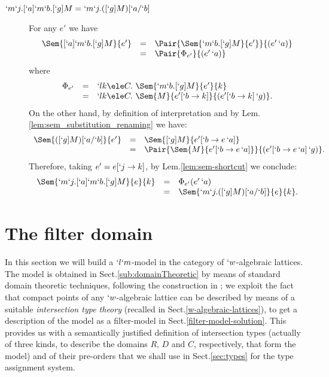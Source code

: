 \documentclass{CSML}
\begin{document}
\begin{description}
\item [{$`m`j.[`a]`m`b.[`g]M = `m`j. ([`g]M)[`a/`b] $}]
For any $e'$ %
we have 
 \[ \begin{array}{rcl}
\Sem{[`a]`m`b.[`g]M}{e'} 
	&=& \Pair{\Sem{`m`b.[`g]M}{e'}}{(e'\, `a)} \\ 
	&=& \Pair{\Phi_{e'}}{(e'\, `a)} \end{array} \]
where
 \[ \begin{array}{rcl}
\Phi_{e'} 
	&=& `l k \ele C.~\Sem{`m`b.[`g]M}{e'}{k} \\ 
	&=& `l k \ele C.~\Sem{M}{e'[`b \to k]}{(e'[`b \to k]\, `g)}. 
 \end{array} \]
On the other hand, by definition of interpretation and by Lem.\skp\ref{lem:sem_substitution_renaming} we have:
 \[ \begin{array}{rcl}
\Sem{([`g]M)[`a/`b]}{e'} 
	&=& \Sem{[`g]M}{e'[`b \to e\,`a]} \\
	&=& \Pair{\Sem{M}{e'[`b \to e\,`a]}}{(e'[`b \to e\,`a]\,`g)}.
 \end{array} \]
Therefore, taking $e' = e[`j \to k]$, by Lem.\skp\ref{lem:sem-shortcut} we conclude:
 \[ \begin{array}{rcl}
\Sem{`m`j.[`a]`m`b.[`g]M}{ e }{ k } 
	&=& \Phi_{e'}(e'\,`a) \\
	&=& \Sem{`m`j. ([`g]M)[`a/`b]}{e}{k}.
 \end{array} \]
 \arrayqed[-22pt]

 \end{description}


 \section{The filter domain} \label{sec:filter}

 In this section we will build a $`l`m$-model in the category of $`w$-algebraic lattices. 
The model is obtained in Sect.\skp\ref{sub:domainTheoretic} by means of standard domain theoretic techniques, following the construction in \cite{Streicher-Reus'98}; we exploit the fact that compact points of any $`w$-algebraic lattice can be described by means of a suitable \emph{intersection type theory} (recalled in Sect.\skp\ref{w-algebraic-lattices}), to get a description of the model as a filter-model in Sect.\skp\ref{filter-model-solution}. 
This provides us with a semantically justified definition of intersection types (actually of three kinds, to describe the domains $R$, $D$ and $C$, respectively, that form the model) and of their pre-orders that we shall use in Sect.\skp\ref{sec:types} for the type assignment system.
\end{document}
